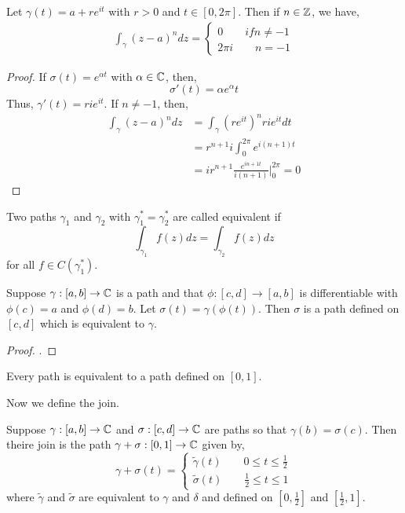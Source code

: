\documentclass[12pt]{amsart}
\begin{document}
\begin{lemma}
    Let $\gamma(t) = a+re^{it}$ with $r > 0$ and $t \in [0, 2\pi]$. Then if $n \in \mathbb Z$, we have, 
    \begin{align*}
        \int_\gamma (z-a)^ndz = \begin{cases}
            0 \qquad if n \neq -1 \\
            2\pi i \qquad n = -1
        \end{cases}
    \end{align*}
\end{lemma}
\begin{proof}
    If $\sigma(t) = e^{\alpha t}$ with $\alpha \in \mathbb C$, then, 
    \[ \sigma'(t) = \alpha e^\alpha t\]
    Thus, $\gamma'(t) = rie^{it}$. If $n \neq -1$, then, 
    \begin{align*}
        \int_\gamma (z-a)^ndz &= \int_\gamma (re^{it})^n rie^{it} dt \\
        &= r^{n+1}i\int_0^{2\pi} e^{i(n+1)t} \\
        &= ir^{n+1} \frac{e^{i{n+1}t}}{i(n+1)}\big|_0^{2\pi} = 0
    \end{align*}
\end{proof}


\begin{definition}
    Two paths $\gamma_1$ and $\gamma_2$ with $\gamma_1^* = \gamma_2^*$ are called equivalent if 
    \[ \int_{\gamma_1} f(z)dz = \int_{\gamma_2} f(z)dz\]
    for all $f \in C(\gamma_1^*)$. 
\end{definition}


\begin{lemma}[W 3.20]
    Suppose $\gamma: [a,b] \to \mathbb C$ is a path and that $\phi: [c,d] \to [a,b]$ is differentiable with $\phi(c) = a$ and $\phi(d) = b$. Let $\sigma(t) = \gamma(\phi(t))$. Then $\sigma$ is a path defined on $[c,d]$ which is equivalent to $\gamma$. 
\end{lemma}
\begin{proof}
    .
\end{proof}

\begin{corollary}
    Every path is equivalent to a path defined on $[0, 1]$. 
\end{corollary}

Now we define the join. 
\begin{definition}
    Suppose $\gamma: [a, b] \to \mathbb C$ and $\sigma: [c, d] \to \mathbb C$ are paths so that $\gamma(b) = \sigma(c)$. Then theire join is the path $\gamma+\sigma: [0, 1] \to \mathbb C$ given by, 
    \[ \gamma+\sigma(t) = \begin{cases}
        \tilde{\gamma}(t)  \qquad 0 \leq t \leq \frac{1}{2} \\
        \tilde{\sigma}(t)  \qquad \frac{1}{2} \leq t \leq 1
    \end{cases}\]
    where $\tilde{\gamma}$ and $\tilde{\sigma}$ are equivalent to $\gamma$ and $\delta$ and defined on $\left[0, \frac{1}{2}\right]$ and $\left[\frac{1}{2}, 1\right]$.
\end{definition}
\end{document}
